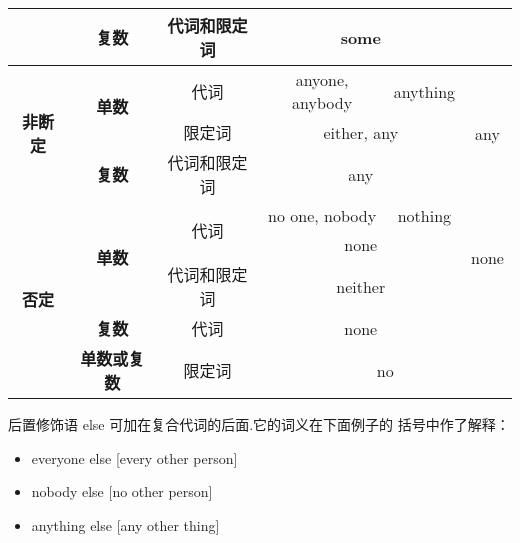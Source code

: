\begin{table}[hbtp]
{\begin{tabular}{|c|c|c|ccc|}
                     & \textbf{复数}                  & 代词和限定词              & \multicolumn{2}{c|}{some}                                             &                       \\ \hline
\multirow{3}{*}{\textbf{非断定}} & \multirow{2}{*}{\textbf{单数}} & 代词                  & \multicolumn{1}{c|}{anyone, anybody}  & \multicolumn{1}{c|}{anything}  & \multirow{3}{*}{any}  \\ \cline{3-5}
                     &                     & 限定词                 & \multicolumn{2}{c|}{either, any}                                        &                       \\ \cline{2-5}
                     & \textbf{复数}                  & 代词和限定词              & \multicolumn{2}{c|}{any}                                              &                       \\ \hline
\multirow{5}{*}{\textbf{否定}} &
  \multirow{3}{*}{\textbf{单数}} &
  \multirow{2}{*}{代词} &
  \multicolumn{1}{c|}{no one, nobody} &
  \multicolumn{1}{c|}{nothing} &
  \multirow{3}{*}{none} \\ \cline{4-5}
                     &                     &                     & \multicolumn{2}{c|}{none}                                             &                       \\ \cline{3-5}
                     &                     & 代词和限定词              & \multicolumn{2}{c|}{neither}                                          &                       \\ \cline{2-6}
                     & \textbf{复数}                  & 代词                  & \multicolumn{2}{c|}{none}                                             &                       \\ \cline{2-6}
                     & \textbf{单数或复数}               & 限定词                 & \multicolumn{3}{c|}{no}                                                                       \\ \hline
\end{tabular}%
}
\end{table}

后置修饰语 else 可加在复合代词的后面.它的词义在下面例子的
括号中作了解释：
\begin{itemize}
\item everyone else [every other person]
\item nobody else [no other person]
\item anything else [any other thing]
\end{itemize}

